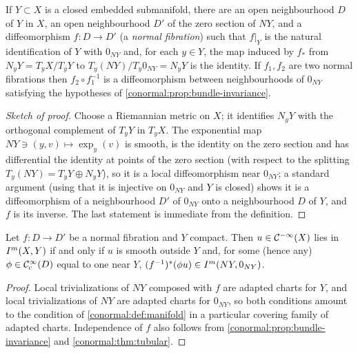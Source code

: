 \begin{theorem}\label{conormal:thm:tubular}
  If $Y\subset X$ is a closed embedded submanifold, there are an open
  neighbourhood $D$ of $Y$ in $X$, an open neighbourhood $D'$ of the zero section
  of $NY$, and a diffeomorphism $f:D\to D'$ (a \emph{normal fibration}) such
  that $f|_Y$ is the natural identification of $Y$ with $0_{NY}$ and, for each
  $y\in Y$, the map induced by $f_*$ from $N_yY=T_yX/T_yY$ to
  $T_y(NY)/T_y0_{NY}=N_yY$ is the identity.  If $f_1,f_2$ are two normal
  fibrations then $f_2\circ f_1^{-1}$ is a diffeomorphism between neighbourhoods
  of $0_{NY}$ satisfying the hypotheses of
  \cref{conormal:prop:bundle-invariance}.
\end{theorem}
\begin{proof}[Sketch of proof]
  Choose a Riemannian metric on $X$; it identifies $N_yY$ with the orthogonal
  complement of $T_yY$ in $T_yX$.  The exponential map $NY\ni(y,v)\mapsto\exp_y(v)$
  is smooth, is the identity on the zero section and has differential the
  identity at points of the zero section (with respect to the splitting
  $T_y(NY)=T_yY\oplus N_yY$), so it is a local diffeomorphism near $0_{NY}$; a
  standard argument (using that it is injective on $0_{NY}$ and $Y$ is closed)
  shows it is a diffeomorphism of a neighbourhood $D'$ of $0_{NY}$ onto a
  neighbourhood $D$ of $Y$, and $f$ is its inverse.  The last statement is
  immediate from the definition.
\end{proof}

\begin{proposition}\label{conormal:prop:fibration-def}
  Let $f:D\to D'$ be a normal fibration and $Y$ compact.  Then $u\in\mathcal{C}^{-\infty}(X)$
  lies in $I^{m}(X,Y)$ if and only if $u$ is smooth outside $Y$ and, for some
  (hence any) $\phi\in\mathcal{C}^\infty_{\mathrm{c}}(D)$ equal to one near $Y$, $(f^{-1})^*(\phi u)\in
  I^{m}(NY,0_{NY})$.
\end{proposition}
\begin{proof}
  Local trivializations of $NY$ composed with $f$ are adapted charts for $Y$, and
  local trivializations of $NY$ are adapted charts for $0_{NY}$, so both
  conditions amount to the condition of \cref{conormal:def:manifold} in a
  particular covering family of adapted charts.  Independence of $f$ also
  follows from \cref{conormal:prop:bundle-invariance} and
  \cref{conormal:thm:tubular}.
\end{proof}

